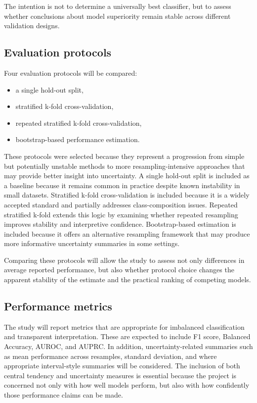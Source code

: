 \documentclass[11pt,a4paper]{article}
\begin{document}
The intention is not to determine a universally best classifier, but to assess whether conclusions about model superiority remain stable across different validation designs.

\subsection{Evaluation protocols}

Four evaluation protocols will be compared:
\begin{itemize}
    \item a single hold-out split,
    \item stratified k-fold cross-validation,
    \item repeated stratified k-fold cross-validation,
    \item bootstrap-based performance estimation.
\end{itemize}

These protocols were selected because they represent a progression from simple but potentially unstable methods to more resampling-intensive approaches that may provide better insight into uncertainty. A single hold-out split is included as a baseline because it remains common in practice despite known instability in small datasets. Stratified k-fold cross-validation is included because it is a widely accepted standard and partially addresses class-composition issues. Repeated stratified k-fold extends this logic by examining whether repeated resampling improves stability and interpretive confidence. Bootstrap-based estimation is included because it offers an alternative resampling framework that may produce more informative uncertainty summaries in some settings.

Comparing these protocols will allow the study to assess not only differences in average reported performance, but also whether protocol choice changes the apparent stability of the estimate and the practical ranking of competing models.

\subsection{Performance metrics}

The study will report metrics that are appropriate for imbalanced classification and transparent interpretation. These are expected to include F1 score, Balanced Accuracy, AUROC, and AUPRC. In addition, uncertainty-related summaries such as mean performance across resamples, standard deviation, and where appropriate interval-style summaries will be considered. The inclusion of both central tendency and uncertainty measures is essential because the project is concerned not only with how well models perform, but also with how confidently those performance claims can be made.
\end{document}
